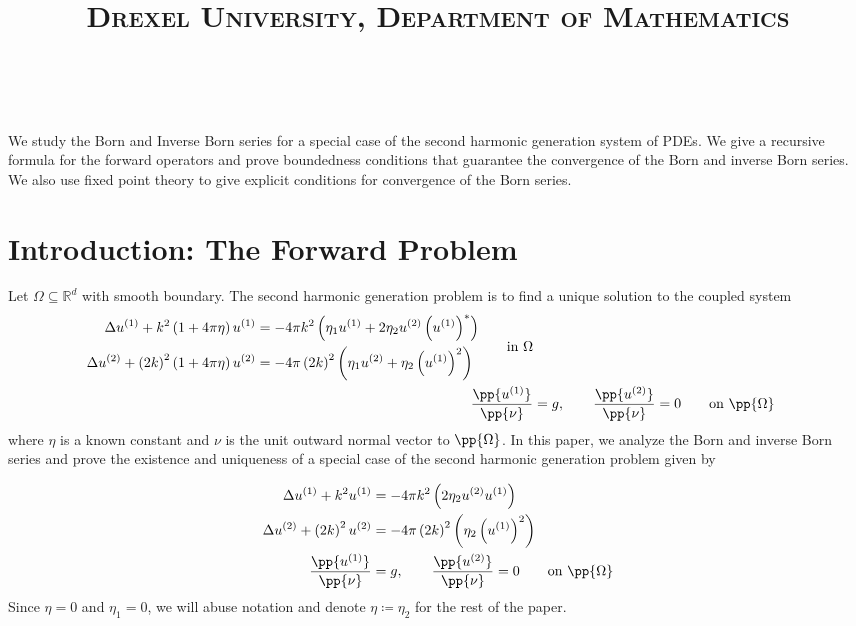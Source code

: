 \documentclass[a4paper, 12pt]{article}
\title{
\normalfont \normalsize
\textsc{Drexel University, Department of Mathematics} \\ [8pt] %
\huge\myclass\\
}
\author{\myname}
\begin{document}
\maketitle
\abstract
We study the Born and Inverse Born series for a special case of the second harmonic generation system of PDEs.
We give a recursive formula for the forward operators and prove boundedness conditions that guarantee the convergence of the Born and inverse Born series.
We also use fixed point theory to give explicit conditions for convergence of the Born series.

\section{Introduction: The Forward Problem}\label{intro}
Let $\Omega \subseteq \mathbb{R}^{d}$ with smooth boundary.
The second harmonic generation problem is to find a unique solution to the coupled system
\begin{align*}
	\begin{split}
	\Delta u^{(1)} + k^2\left( 1 + 4\pi \eta \right) u^{(1)} &= -4\pi k^2\left( \eta_1u^{(1)} + 2\eta_2u^{(2)}\left(u^{(1)}\right)^{*} \right)\\
	\Delta u^{(2)} + \left( 2k \right)^2\left( 1 + 4\pi \eta \right) u^{(2)} &= -4\pi\left( 2k \right)^2\left( \eta_1u^{(2)} + \eta_2\left(u^{(1)}\right)^{2} \right)
	\end{split}
	\qquad\text{in $\Omega$}\\
	\dfrac{\pp{u^{(1)}}}{\pp{\nu}} &= g, \qquad \dfrac{\pp{u^{(2)}}}{\pp{\nu}}= 0 \qquad \text{on } \pp{\Omega}
\end{align*}
where $\eta$ is a known constant and $\nu$ is the unit outward normal vector to $\pp{\Omega}$.
In this paper, we analyze the Born and inverse Born series and prove the existence and uniqueness of a special case of the second harmonic generation problem given by

\begin{align}\label{eq:1:1}
	\begin{split}
	\Delta u^{(1)} + k^2 u^{(1)} &= -4\pi k^2\left( 2\eta_2 u^{(2)}u^{(1)} \right) \\
	\Delta u^{(2)} + \left( 2k \right)^2 u^{(2)} &= -4\pi\left( 2k \right)^2\left( \eta_2 \left(u^{(1)}\right)^2 \right)\\
	\dfrac{\pp{u^{(1)}}}{\pp{\nu}} &= g, \qquad \dfrac{\pp{u^{(2)}}}{\pp{\nu}}= 0 \qquad \text{on } \pp{\Omega}
	\end{split}
\end{align}
Since $\eta=0$ and $\eta_1= 0$, we will abuse notation and denote $\eta \coloneqq \eta_2$
for the rest of the paper.
\end{document}
